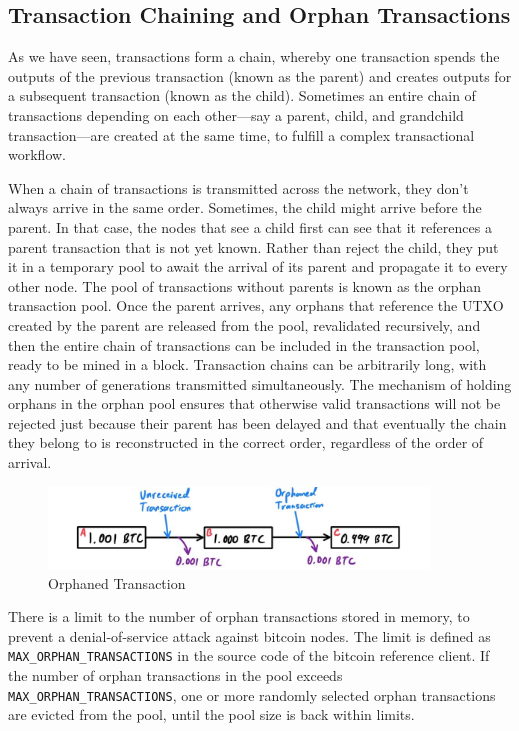 \documentclass{article}
\begin{document}
  \subsection{Transaction Chaining and Orphan Transactions}

    As we have seen, transactions form a chain, whereby one transaction spends the outputs of the previous transaction (known as the parent) and creates outputs for a subsequent transaction (known as the child). Sometimes an entire chain of transactions depending on each other—say a parent, child, and grandchild transaction—are created at the same time, to fulfill a complex transactional workflow.

    When a chain of transactions is transmitted across the network, they don't always arrive in the same order. Sometimes, the child might arrive before the parent. In that case, the nodes that see a child first can see that it references a parent transaction that is not yet known. Rather than reject the child, they put it in a temporary pool to await the arrival of its parent and propagate it to every other node. The pool of transactions without parents is known as the orphan transaction pool. Once the parent arrives, any orphans that reference the UTXO created by the parent are released from the pool, revalidated recursively, and then the entire chain of transactions can be included in the transaction pool, ready to be mined in a block. Transaction chains can be arbitrarily long, with any number of generations transmitted simultaneously. The mechanism of holding orphans in the orphan pool ensures that otherwise valid transactions will not be rejected just because their parent has been delayed and that eventually the chain they belong to is reconstructed in the correct order, regardless of the order of arrival.

    \begin{figure}[H]
    \centering
    \includegraphics[width=0.9\textwidth]{img/Orphaned_Transaction.jpg}
    \caption{Orphaned Transaction}
    \end{figure}

    There is a limit to the number of orphan transactions stored in memory, to prevent a denial-of-service attack against bitcoin nodes. The limit is defined as \texttt{MAX\_ORPHAN\_TRANSACTIONS} in the source code of the bitcoin reference client. If the number of orphan transactions in the pool exceeds \texttt{MAX\_ORPHAN\_TRANSACTIONS}, one or more randomly selected orphan transactions are evicted from the pool, until the pool size is back within limits.
\end{document}
